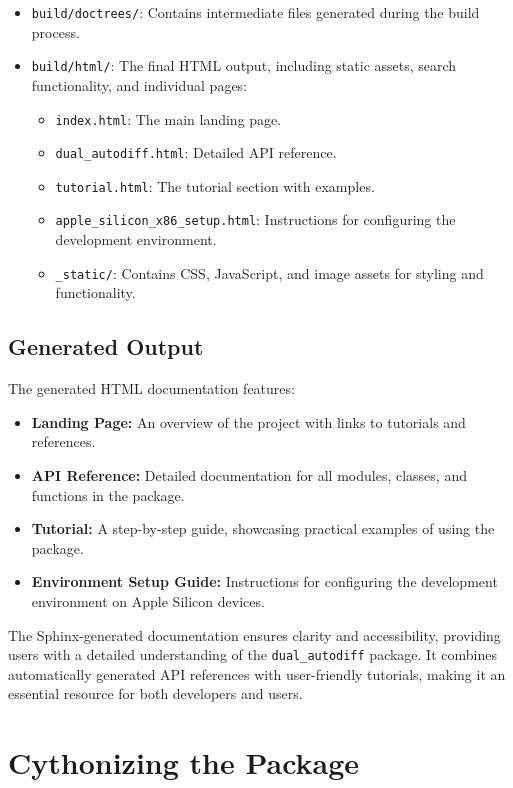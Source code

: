 \documentclass[a4paper,12pt]{article}
\begin{document}
\begin{itemize}
\begin{itemize}
        \item \texttt{build/doctrees/}: Contains intermediate files generated during the build process.
        \item \texttt{build/html/}: The final HTML output, including static assets, search functionality, and individual pages:
        \begin{itemize}
            \item \texttt{index.html}: The main landing page.
            \item \texttt{dual\_autodiff.html}: Detailed API reference.
            \item \texttt{tutorial.html}: The tutorial section with examples.
            \item \texttt{apple\_silicon\_x86\_setup.html}: Instructions for configuring the development environment.
            \item \texttt{\_static/}: Contains CSS, JavaScript, and image assets for styling and functionality.
        \end{itemize}
    \end{itemize}
\end{itemize}

\subsection{Generated Output}
The generated HTML documentation features:
\begin{itemize}
    \item \textbf{Landing Page:} An overview of the project with links to tutorials and references.
    \item \textbf{API Reference:} Detailed documentation for all modules, classes, and functions in the package.
    \item \textbf{Tutorial:} A step-by-step guide, showcasing practical examples of using the package.
    \item \textbf{Environment Setup Guide:} Instructions for configuring the development environment on Apple Silicon devices.
\end{itemize}

The Sphinx-generated documentation ensures clarity and accessibility, providing users with a detailed understanding of the \texttt{dual\_autodiff} package. It combines automatically generated API references with user-friendly tutorials, making it an essential resource for both developers and users.

\section{Cythonizing the Package}
\end{document}
